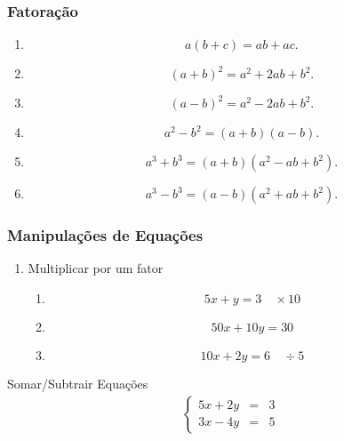 \documentclass[12pt,a4paper]{article}
\begin{document}
\subsubsection{Fatoração}
\begin{enumerate}
    \item
    \[
        a(b+c) = ab + ac.
    \]
    \item
    \[
    (a+b)^2 = a^2 + 2ab + b^2.
    \]
    \item
    \[
        (a-b)^2 = a^2 - 2ab + b^2.
    \]    
    \item
    \[
    a^2 - b^2 = (a + b)(a - b).
    \]
    \item
    \[
    a^3 + b^3 = (a + b)(a^2 - ab + b^2).
    \]
    \item
    \[
    a^3 - b^3 = (a - b)(a^2 + ab + b^2).
    \]
\end{enumerate}

\subsubsection{Manipulações de Equações}
\begin{enumerate}
    \item Multiplicar por um fator
    \begin{enumerate}
        \item 
        \[ 
        5x + y = 3 \quad \times 10
        \]
        \item 
        \[
        50x + 10y = 30
        \]
        \item 
        \[
        10x + 2y = 6 \quad \div 5
        \]
    \end{enumerate}
\end{enumerate} %

\item Somar/Subtrair Equações
\begin{align*}
    \left\{
    \begin{array}{rcl}
        5x + 2y &=& 3 \\
        3x - 4y &=& 5
    \end{array}
    \right.
\end{align*}
\end{document}
